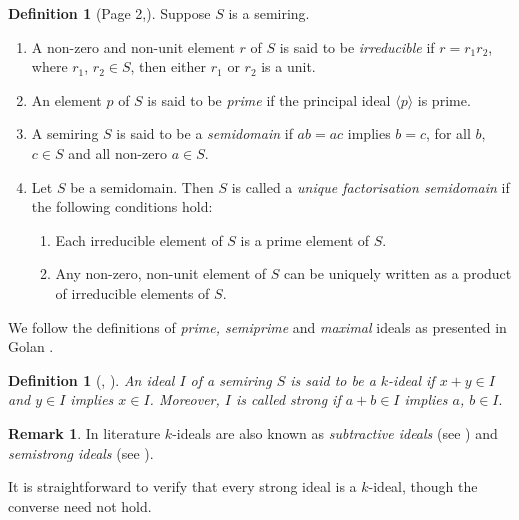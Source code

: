 \documentclass[11pt,leqno]{amsart}
\theoremstyle{definition}
\newtheorem{definition}[theorem]{Definition}
\newtheorem{remark}[theorem]{Remark}
\numberwithin{equation}{section}
\begin{document}
\begin{definition}[Page 2,\cite{Nasehpour19}] Suppose $S$ is a semiring.
\begin{enumerate}
\item A non-zero and non-unit element $r$ of  $S$ is said to be \emph{irreducible} if $r=r_1r_2$, where $r_1$, $r_2\in S$, then either $r_1$ or $r_2$ is a unit.

\item  An element $p$ of  $S$ is said to be \emph{prime} if the principal ideal $\langle p \rangle$ is prime.
        
\item A semiring $S$ is said to be a \emph{semidomain} if $ab=ac$ implies $b=c$, for all $b$, $c \in S$ and all non-zero $a \in S$.
        
        \item Let $S$ be a semidomain. Then $S$ is called a \emph{unique factorisation semidomain} if the following conditions hold:
        \begin{enumerate}
            \item Each irreducible element of $S$ is a prime element of $S$.
            \item Any non-zero, non-unit element of $S$ can be uniquely written as a product of irreducible elements of $S$.
        \end{enumerate}
    \end{enumerate}
\end{definition}

We follow the definitions of \emph{prime, semiprime} and \emph{maximal} ideals as presented in Golan \cite[Chapter 6, Chapter 7]{Golan}.

\begin{definition}[\cite{Henriksen58}, \cite{Golan}]\label{Def: k-ideal and strong ideal}
    \textit{An ideal $I$ of a semiring $S$ is said to be a \emph{$k$-ideal} if $x+y\in I$ and $y\in I$ implies $x\in I$. Moreover, $I$ is called \emph{strong} if $a+b\in I$ implies $a$, $b\in I$}.
\end{definition} 

\begin{remark}
    In literature $k$-ideals are also known as \emph{subtractive ideals} (see \cite[Chapter 6]{Golan}) and \emph{semistrong ideals} (see \cite[Section 1]{Chermynkh12}).
\end{remark}

It is straightforward to verify that every strong ideal is a $k$-ideal, though the converse need not hold. 
\end{document}
